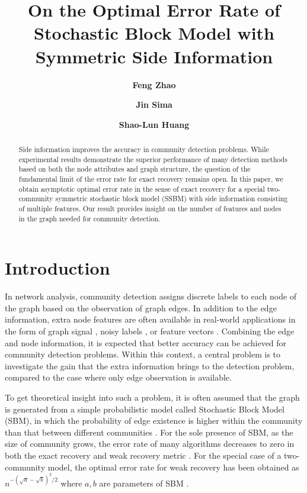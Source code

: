 \documentclass[conference,letterpaper]{IEEEtran}
\title{On the Optimal Error Rate of Stochastic Block Model with Symmetric Side Information}
\author[1]{\textbf{Feng Zhao}}
\author[2]{\textbf{Jin Sima}}
\author[3]{\textbf{Shao-Lun Huang}}
\affil[1]{\normalsize{Department of Electronic Engineering,
		Tsinghua University, 
		Beijing, China 100084}}
\affil[2]{\normalsize{Department of Electrical Engineering, California Institute of Technology, Pasadena 91125, CA, USA}}
\affil[3]{\normalsize{DSIT Research Center,
		Tsinghua-Berkeley Shenzhen Institute,
		Shenzhen, China 518055}}
\begin{document}
\maketitle
\begin{abstract}
    Side information improves the accuracy in community detection problems.
    While experimental results demonstrate the superior performance of many detection methods
    based on both the node attributes and graph structure, the question of the fundamental limit of the error rate for exact recovery remains open.
    In this paper, we obtain asymptotic optimal error rate in the sense of 
    exact recovery for a special two-community symmetric stochastic block model (SSBM) with side information consisting of multiple features.
    Our result provides insight on the number of features and nodes in the graph needed for community detection.
\end{abstract}
\section{Introduction}
In network analysis, community detection assigns discrete labels to each node of the graph based on the observation of graph edges.
In addition to the edge information, extra node features are often available in real-world applications in the form of graph signal \cite{dong2020graph},
noisy labels \cite{mossel2016local}, or
feature vectors \cite{zhang2016community}. Combining the edge and node information, it is expected that better
accuracy can be achieved for community detection problems. Within this context, a central problem 
is to investigate the gain that the extra information brings to the detection problem, compared to the case where only edge observation is available.

To get theoretical insight into such a problem, it is often assumed that the graph is generated from a simple probabilistic model called Stochastic Block Model (SBM), in which the probability of edge existence is higher within the community than that between different communities \cite{holland1983stochastic}. For the sole presence of SBM, as the size of community grows, the error rate of many algorithms decreases to zero in both the exact recovery and weak recovery metric \cite{yun2014accurate,fei2019achieving}. For the special case of a two-community model,
the optimal error rate for weak recovery has been obtained as $n^{-(\sqrt{a} - \sqrt{b})^2/2}$ where $a,b$ are parameters of SBM \cite{zhang2016}.
\end{document}
